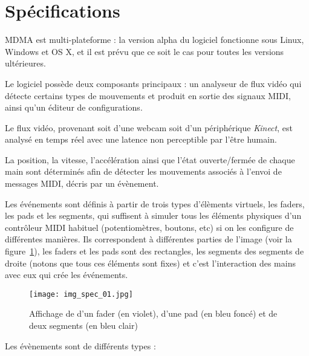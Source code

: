 \section{Spécifications}
\par MDMA est multi-plateforme : la version alpha du logiciel fonctionne sous Linux, Windows et OS X, et il est prévu que ce soit le cas pour toutes les versions ultérieures.
\par Le logiciel possède deux composants principaux : un analyseur de flux vidéo qui détecte certains types de mouvements et produit en sortie des signaux MIDI, ainsi qu'un éditeur de configurations.
\par Le flux vidéo, provenant soit d'une webcam soit d'un périphérique \emph{Kinect}, est analysé en temps réel avec une latence non perceptible par l'être humain.
\par La position, la vitesse, l'accélération ainsi que l'état ouverte/fermée de chaque main sont déterminés afin de détecter les mouvements associés à l'envoi de messages MIDI, décris par un évènement.
\par Les événements sont définis à partir de trois types d'élèments virtuels, les faders, les pads et les segments, qui suffisent à simuler tous les éléments physiques d'un contrôleur MIDI habituel (potentiomètres, boutons, etc) si on les configure de différentes manières. Ils correspondent à différentes parties de l'image (voir la figure~\ref{img_spec_01}), les faders et les pads sont des rectangles, les segments des segments de droite (notons que tous ces éléments sont fixes) et c'est l'interaction des mains avec eux qui crée les événements. 
\begin{figure}[h]
\centering
    \texttt{[image: img\_spec\_01.jpg]}
    \caption{Affichage de d'un fader (en violet), d'une pad (en bleu foncé) et de deux segments (en bleu clair)}
    \label{img_spec_01}
\end{figure}
\par Les évènements sont de différents types :
